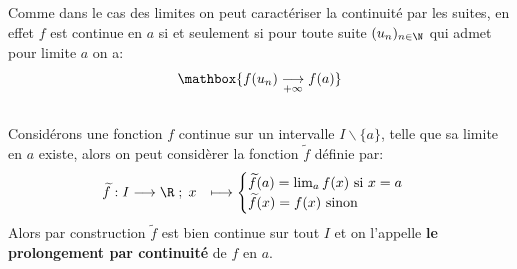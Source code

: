 \subsection*{}

Comme dans le cas des limites on peut caractériser la continuité par les suites, en effet \(f\) est continue en \(a\) si et seulement si pour toute suite \((u_n)_{n\in\N}\) qui admet pour limite \(a\) on a:
\[
   \mathbox{f(u_n) \underset{+\infty}{\longrightarrow} f(a)}   
\]

\subsection*{}

Considérons une fonction \(f\) continue sur un intervalle \(I \backslash \{a\}\), telle que sa limite en \(a\) existe, alors on peut considèrer la fonction \(\widetilde{f}\) définie par:
\[
   \begin{aligned}
      \widetilde{f}: I &\longrightarrow \R \; ; \; x &\longmapsto \begin{cases}
         \widetilde{f}(a) = \lim_{a} f(x) \text{ si } x = a\\
         \widetilde{f}(x) = f(x) \text{ sinon}
      \end{cases}
   \end{aligned}
\]
Alors par construction \(\widetilde{f}\) est bien continue sur tout \(I\) et on l'appelle \textbf{le prolongement par continuité} de \(f\) en \(a\).

\subsection*{}

